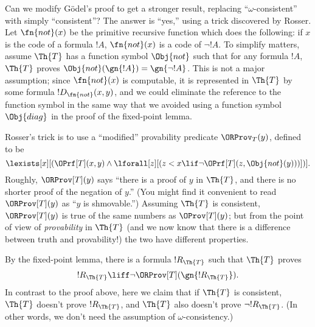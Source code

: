 \documentclass[../../../include/open-logic-section]{subfiles}
\begin{document}


Can we modify G\"odel's proof to get a stronger result, replacing
``$\omega$-consistent'' with simply ``consistent''? The answer is
``yes,'' using a trick discovered by Rosser. Let $\fn{not}(x)$ be the
primitive recursive function which does the following: if $x$ is the
code of a formula $!A$, $\fn{not}(x)$ is a code of $\lnot !A$.  To
simplify matters, assume $\Th{T}$ has a function symbol $\Obj{not}$
such that for any formula $!A$, $\Th{T}$ proves $\Obj{not}(\gn{!A}) =
\gn{\lnot !A}$. This is not a major assumption; since $\fn{not}(x)$ is
computable, it is represented in $\Th{T}$ by some formula
$!D_{\fn{not}}(x,y)$, and we could eliminate the reference to the
function symbol in the same way that we avoided using a function
symbol $\Obj{diag}$ in the proof of the fixed-point lemma.

Rosser's trick is to use a ``modified'' provability predicate
$\ORProv_T(y)$, defined to be
\[
\lexists[x][(\OPrf[T](x,y) \land \lforall[z][(z < x \lif \lnot
  \OPrf[T](z,{\Obj{not}}(y)))])].
\]
Roughly, $\ORProv[T](y)$ says ``there is a proof of $y$ in $\Th{T}$,
and there is no shorter proof of the negation of $y$.'' (You might
find it convenient to read $\ORProv[T](y)$ as ``$y$ is shmovable.'')
Assuming $\Th{T}$ is consistent, $\ORProv[T](y)$ is true of the same
numbers as $\OProv[T](y)$; but from the point of view of {\em
  provability} in $\Th{T}$ (and we now know that there is a difference
between truth and provability!) the two have different properties.

By the fixed-point lemma, there is a formula $!R_\Th{T}$ such that $\Th{T}$
proves
\[
!R_\Th{T} \liff \lnot \ORProv[T](\gn{!R_\Th{T}}).
\]
In contrast to the proof above, here we claim that if $\Th{T}$ is
consistent, $\Th{T}$ doesn't prove $!R_\Th{T}$, and $\Th{T}$ also
doesn't prove $\lnot !R_\Th{T}$. (In other words, we don't need the
assumption of $\omega$-consistency.)
\end{document}
